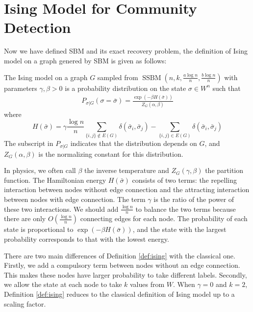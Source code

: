\documentclass[entropy,article,submit,moreauthors,pdftex]{Definitions/mdpi}
\newcommand{\A}{\frac{a \log n}{n}}
\newcommand{\B}{\frac{b \log n}{n}}
\newcommand{\1}{\mathbbm{1}}
\DeclareMathOperator{\SSBM}{SSBM}
\begin{document}
\section{Ising Model for Community Detection}\label{sec:sibm}
Now we have defined SBM and its exact recovery problem, the definition of Ising model on a graph genered by SBM is given
as follows:
\begin{Definition}\label{def:ising}
	The Ising model on a graph $G$ sampled from $\SSBM(n,k,\A,\B)$ with parameters $\gamma,\beta>0$
	is a probability distribution on the state $\sigma\in W^n$ such that
	\begin{align} \label{eq:isingma}
	P_{\sigma|G}(\sigma=\bar{\sigma})=\frac{\exp(-\beta H(\bar{\sigma}))}{Z_G(\alpha,\beta)}
	\end{align}
	where
	\begin{equation}\label{eq:energy}
	H(\bar{\sigma}) = \gamma \frac{\log n}{n} \sum_{\{i,j\}\not\in E(G)} \delta(\bar{\sigma}_i, \bar{\sigma}_j)
	- \sum_{\{i,j\}\in E(G)} \delta(\bar{\sigma}_i, \bar{\sigma}_j)
	\end{equation}
	The subscript in $P_{\sigma|G}$ indicates that the distribution depends on $G$, and
	$Z_G(\alpha,\beta)$ is the normalizing constant for this distribution.
\end{Definition}
In physics, we often call $\beta$ the inverse temperature and $Z_G(\gamma, \beta)$ the partition function.
The Hamiltonian energy $H(\bar{\sigma})$ consists of two terms: the repelling interaction between nodes without edge connection
and the attracting interaction between nodes with edge connection. The term $\gamma$ is the ratio of the power of these two
interactions. We should add $\frac{\log n}{n}$ to balance the two terms because there are only $O(\frac{\log n}{n})$
connecting edges for each node.
The probability of each state is proportional to $\exp(-\beta H(\bar{\sigma}))$, and the state with the largest
probability corresponds to that with the lowest energy.

There are two main differences of Definition \ref{def:ising} with the classical one. Firstly, we add a compulsory term
between nodes without an edge connection. This makes these nodes have larger probability to take different labels.
Secondly, we allow the state at each node to take $k$ values from $W$.
When $\gamma = 0$ and $k=2$, Definition \ref{def:ising}
reduces to the classical definition of Ising model up to a scaling factor.
\end{document}
